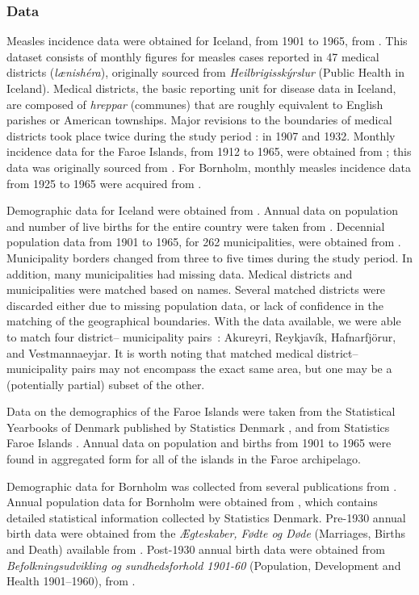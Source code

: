 \documentclass[10pt]{article}
\begin{document}
\subsubsection*{Data}

Measles incidence data were obtained for Iceland, from 1901 to 1965, from \cite{Cliff1981}. This dataset consists of monthly figures for measles cases reported in 47 medical districts (\textit{l\ae nish\'{e}ra\dh{}}), originally sourced from \textit{Heilbrig\dh{}issk\'{y}rslur} (Public Health in Iceland). Medical districts, the basic reporting unit for disease data in Iceland, are composed of \textit{hreppar} (communes) that are roughly equivalent to English parishes or American townships. Major revisions to the boundaries of medical districts took place twice during the study period : in 1907 and 1932. Monthly incidence data for the Faroe Islands, from 1912 to 1965, were obtained from \cite{Cliff2000}; this data was originally sourced from \cite{Lancaster1990}. For Bornholm, monthly measles incidence data from 1925 to 1965 were acquired from \cite{Kingdom}.

Demographic data for Iceland were obtained from \cite{StatsIceland}. Annual data on population and number of live births for the entire country were taken from \cite{StatsIcelandBirths}. Decennial population data from 1901 to 1965, for 262 municipalities, were obtained from \cite{StatsIcelandPop}. Municipality borders changed from three to five times during the study period. In addition, many municipalities had missing data. Medical districts and municipalities were matched based on names. Several matched districts were discarded either due to missing population data, or lack of confidence in the matching of the geographical boundaries. With the data available, we were able to match four district-- municipality pairs~: Akureyri, Reykjav\'{i}k, Hafnarfj\"{o}r\dh{}ur, and Vestmannaeyjar. It is worth noting that matched medical district--municipality pairs may not encompass the exact same area, but one may be a (potentially partial) subset of the other. 

Data on the demographics of the Faroe Islands were taken from the Statistical Yearbooks of Denmark published by Statistics Denmark \cite{StatsDenmark}, and from Statistics Faroe Islands \cite{StatsFaroe}. Annual data on population and births from 1901 to 1965 were found in aggregated form for all of the islands in the Faroe archipelago. 

Demographic data for Bornholm was collected from several publications from \cite{StatsDenmark}. Annual population data for Bornholm were obtained from \cite{StatsDenmarkPop}, which contains detailed statistical information collected by Statistics Denmark. Pre-1930 annual birth data were obtained from the \textit{\AE{}gteskaber, F\o{}dte og D\o{}de} (Marriages, Births and Death) available from \cite{StatsDenmarkBirths1}. Post-1930 annual birth data were obtained from \textit{Befolkningsudvikling og sundhedsforhold 1901-60} (Population, Development and Health 1901--1960), from \cite{StatsDenmarkBirths2}.
\end{document}
